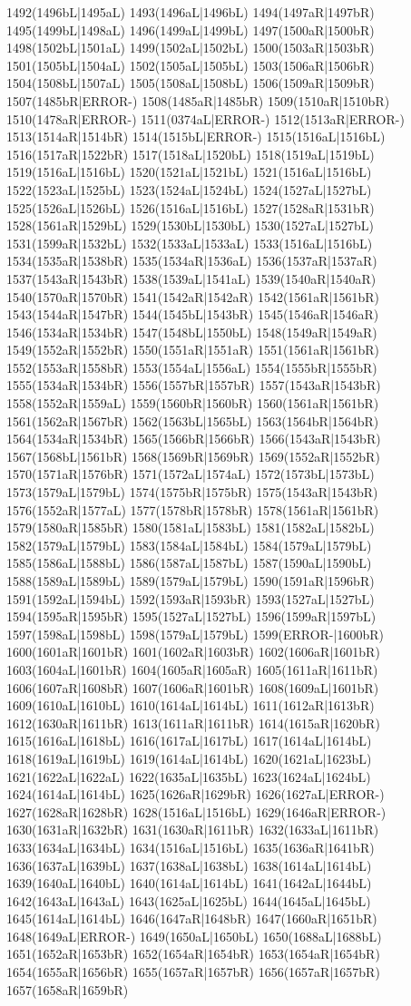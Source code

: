 1492(1496bL|1495aL) 1493(1496aL|1496bL) 1494(1497aR|1497bR) 1495(1499bL|1498aL) 1496(1499aL|1499bL) 1497(1500aR|1500bR) 1498(1502bL|1501aL) 1499(1502aL|1502bL) 1500(1503aR|1503bR) 1501(1505bL|1504aL) 1502(1505aL|1505bL) 1503(1506aR|1506bR) 1504(1508bL|1507aL) 1505(1508aL|1508bL) 1506(1509aR|1509bR) 1507(1485bR|ERROR-) 1508(1485aR|1485bR) 1509(1510aR|1510bR) 1510(1478aR|ERROR-) 1511(0374aL|ERROR-) 1512(1513aR|ERROR-) 1513(1514aR|1514bR) 1514(1515bL|ERROR-) 1515(1516aL|1516bL) 1516(1517aR|1522bR) 1517(1518aL|1520bL) 1518(1519aL|1519bL) 1519(1516aL|1516bL) 1520(1521aL|1521bL) 1521(1516aL|1516bL) 1522(1523aL|1525bL) 1523(1524aL|1524bL) 1524(1527aL|1527bL) 1525(1526aL|1526bL) 1526(1516aL|1516bL) 1527(1528aR|1531bR) 1528(1561aR|1529bL) 1529(1530bL|1530bL) 1530(1527aL|1527bL) 1531(1599aR|1532bL) 1532(1533aL|1533aL) 1533(1516aL|1516bL) 1534(1535aR|1538bR) 1535(1534aR|1536aL) 1536(1537aR|1537aR) 1537(1543aR|1543bR) 1538(1539aL|1541aL) 1539(1540aR|1540aR) 1540(1570aR|1570bR) 1541(1542aR|1542aR) 1542(1561aR|1561bR) 1543(1544aR|1547bR) 1544(1545bL|1543bR) 1545(1546aR|1546aR) 1546(1534aR|1534bR) 1547(1548bL|1550bL) 1548(1549aR|1549aR) 1549(1552aR|1552bR) 1550(1551aR|1551aR) 1551(1561aR|1561bR) 1552(1553aR|1558bR) 1553(1554aL|1556aL) 1554(1555bR|1555bR) 1555(1534aR|1534bR) 1556(1557bR|1557bR) 1557(1543aR|1543bR) 1558(1552aR|1559aL) 1559(1560bR|1560bR) 1560(1561aR|1561bR) 1561(1562aR|1567bR) 1562(1563bL|1565bL) 1563(1564bR|1564bR) 1564(1534aR|1534bR) 1565(1566bR|1566bR) 1566(1543aR|1543bR) 1567(1568bL|1561bR) 1568(1569bR|1569bR) 1569(1552aR|1552bR) 1570(1571aR|1576bR) 1571(1572aL|1574aL) 1572(1573bL|1573bL) 1573(1579aL|1579bL) 1574(1575bR|1575bR) 1575(1543aR|1543bR) 1576(1552aR|1577aL) 1577(1578bR|1578bR) 1578(1561aR|1561bR) 1579(1580aR|1585bR) 1580(1581aL|1583bL) 1581(1582aL|1582bL) 1582(1579aL|1579bL) 1583(1584aL|1584bL) 1584(1579aL|1579bL) 1585(1586aL|1588bL) 1586(1587aL|1587bL) 1587(1590aL|1590bL) 1588(1589aL|1589bL) 1589(1579aL|1579bL) 1590(1591aR|1596bR) 1591(1592aL|1594bL) 1592(1593aR|1593bR) 1593(1527aL|1527bL) 1594(1595aR|1595bR) 1595(1527aL|1527bL) 1596(1599aR|1597bL) 1597(1598aL|1598bL) 1598(1579aL|1579bL) 1599(ERROR-|1600bR) 1600(1601aR|1601bR) 1601(1602aR|1603bR) 1602(1606aR|1601bR) 1603(1604aL|1601bR) 1604(1605aR|1605aR) 1605(1611aR|1611bR) 1606(1607aR|1608bR) 1607(1606aR|1601bR) 1608(1609aL|1601bR) 1609(1610aL|1610bL) 1610(1614aL|1614bL) 1611(1612aR|1613bR) 1612(1630aR|1611bR) 1613(1611aR|1611bR) 1614(1615aR|1620bR) 1615(1616aL|1618bL) 1616(1617aL|1617bL) 1617(1614aL|1614bL) 1618(1619aL|1619bL) 1619(1614aL|1614bL) 1620(1621aL|1623bL) 1621(1622aL|1622aL) 1622(1635aL|1635bL) 1623(1624aL|1624bL) 1624(1614aL|1614bL) 1625(1626aR|1629bR) 1626(1627aL|ERROR-) 1627(1628aR|1628bR) 1628(1516aL|1516bL) 1629(1646aR|ERROR-) 1630(1631aR|1632bR) 1631(1630aR|1611bR) 1632(1633aL|1611bR) 1633(1634aL|1634bL) 1634(1516aL|1516bL) 1635(1636aR|1641bR) 1636(1637aL|1639bL) 1637(1638aL|1638bL) 1638(1614aL|1614bL) 1639(1640aL|1640bL) 1640(1614aL|1614bL) 1641(1642aL|1644bL) 1642(1643aL|1643aL) 1643(1625aL|1625bL) 1644(1645aL|1645bL) 1645(1614aL|1614bL) 1646(1647aR|1648bR) 1647(1660aR|1651bR) 1648(1649aL|ERROR-) 1649(1650aL|1650bL) 1650(1688aL|1688bL) 1651(1652aR|1653bR) 1652(1654aR|1654bR) 1653(1654aR|1654bR) 1654(1655aR|1656bR) 1655(1657aR|1657bR) 1656(1657aR|1657bR) 1657(1658aR|1659bR) 